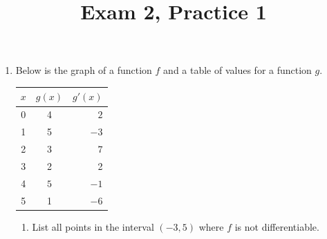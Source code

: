 \documentclass{article}
\theoremstyle{theorem}
\begin{document}
  \title{Exam 2, Practice 1}


\listofproblems

\begin{enumerate}
\item \label{fall2019-midterm-practice1-2-modified}  

  Below is the graph of a function $f$ and a table of values for a function $g$.

  \begin{minipage}{0.5\textwidth}
  \end{minipage}
  \begin{minipage}{0.3\textwidth}
    \begin{tabular}{|c|c|r|}
      \hline
      $x$&$g(x)$&$g'(x)$\\[5pt]
      \hline
      0&4&$2$\\[5pt]
      \hline
      1&5&$-3$\\[5pt]
      \hline
      2&3&$7$\\[5pt]
      \hline
      3&2&2\\[5pt]
      \hline
      4&$ 5$&$-1$\\[5pt]
      \hline
      5&1&$-6$\\[5pt]
      \hline
    \end{tabular}
  \end{minipage}

  \begin{enumerate}
  \item
    \begin{problem}[0.25in]
      List all points in the interval $(-3, 5)$ where $f$ is not differentiable.
    \end{problem}


\end{enumerate}
\end{enumerate}
\end{document}
